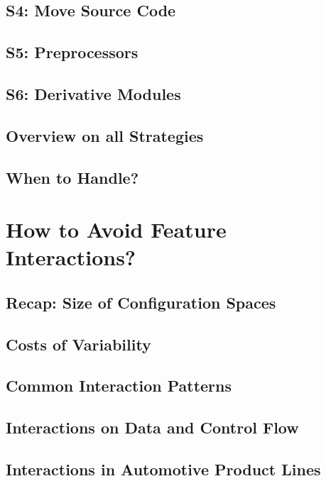 \documentclass[
	aspectratio=169, %
	8pt, %
	handout, %
]{beamer}
\begin{document}
\subsection{S4: Move Source Code}
\subsection{S5: Preprocessors}
\subsection{S6: Derivative Modules}
\subsection{Overview on all Strategies}
\subsection{When to Handle?}

%

\lessonslearned{
	\item \ldots
}{
	\item \ldots
}{
	\ldots
}

\sectionend

\section{How to Avoid Feature Interactions?}

\subsection{Recap: Size of Configuration Spaces}
\subsection{Costs of Variability}
\subsection{Common Interaction Patterns}
\subsection{Interactions on Data and Control Flow}
\subsection{Interactions in Automotive Product Lines}
\end{document}
